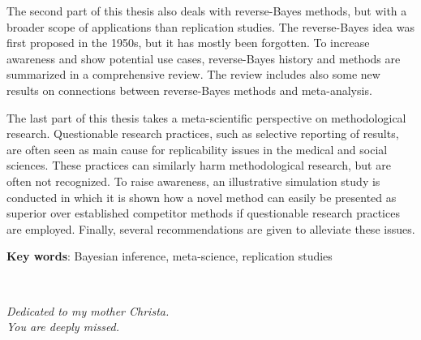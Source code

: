 The second part of this thesis also deals with reverse-Bayes methods, but with a
broader scope of applications than replication studies. The reverse-Bayes idea
was first proposed in the 1950s, but it has mostly been forgotten. To increase
awareness and show potential use cases, reverse-Bayes history and methods are
summarized in a comprehensive review. The review includes also some new results
on connections between reverse-Bayes methods and meta-analysis. %

The last part of this thesis takes a meta-scientific perspective on
methodological research. Questionable research practices, such as selective
reporting of results, are often seen as main cause for replicability issues in
the medical and social sciences. These practices can similarly harm
methodological research, but are often not recognized. To raise awareness, an
illustrative simulation study is conducted in which it is shown how a novel
method can easily be presented as superior over established competitor methods
if questionable research practices are employed. Finally, several
recommendations are given to alleviate these issues.


\textbf{Key words}: Bayesian inference, meta-science, replication studies


\newpage ~

\newpage



\begin{center}
  \vspace*{5cm}

  \textit{Dedicated to my mother Christa. \\
    You are deeply missed.}
\end{center}
